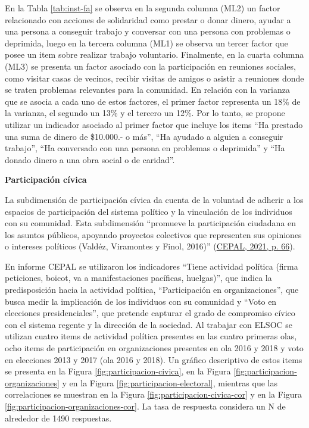 \documentclass[
  12pt,
]{book}
\begin{document}
En la Tabla \ref{tab:inst-fa} se observa en la segunda columna (ML2) un factor relacionado con acciones de solidaridad como prestar o donar dinero, ayudar a una persona a conseguir trabajo y conversar con una persona con problemas o deprimida, luego en la tercera columna (ML1) se observa un tercer factor que posee un item sobre realizar trabajo voluntario. Finalmente, en la cuarta columna (ML3) se presenta un factor asociado con la participación en reuniones sociales, como visitar casas de vecinos, recibir visitas de amigos o asistir a reuniones donde se traten problemas relevantes para la comunidad. En relación con la varianza que se asocia a cada uno de estos factores, el primer factor representa un 18\% de la varianza, el segundo un 13\% y el tercero un 12\%. Por lo tanto, se propone utilizar un indicador asociado al primer factor que incluye los items ``Ha prestado una suma de dinero de \$10.000.- o más'', ``Ha ayudado a alguien a conseguir trabajo'', ``Ha conversado con una persona en problemas o deprimida'' y ``Ha donado dinero a una obra social o de caridad''.

\textbf{Participación cívica}

La subdimensión de participación cívica da cuenta de la voluntad de adherir a los espacios de participación del sistema político y la vinculación de los individuos con su comunidad. Esta subdimensión ``promueve la participación ciudadana en los asuntos públicos, apoyando proyectos colectivos que representen sus opiniones o intereses políticos (Valdéz, Viramontes y Finol, 2016)'' (\protect\hyperlink{ref-cepal_cohesion_2021}{CEPAL, 2021, p. 66}).

En informe CEPAL se utilizaron los indicadores ``Tiene actividad política (firma peticiones, boicot, va a manifestaciones pacíficas, huelgas)'', que indica la predisposición hacia la actividad política, ``Participación en organizaciones'', que busca medir la implicación de los individuos con su comunidad y ``Voto en elecciones presidenciales'', que pretende capturar el grado de compromiso cívico con el sistema regente y la dirección de la sociedad. Al trabajar con ELSOC se utilizan cuatro items de actividad política presentes en las cuatro primeras olas, ocho items de participación en organizaciones presentes en ola 2016 y 2018 y voto en elecciones 2013 y 2017 (ola 2016 y 2018). Un gráfico descriptivo de estos items se presenta en la Figura \ref{fig:participacion-civica}, en la Figura \ref{fig:participacion-organizaciones} y en la Figura \ref{fig:participacion-electoral}, mientras que las correlaciones se muestran en la Figura \ref{fig:participacion-civica-cor} y en la Figura \ref{fig:participacion-organizaciones-cor}. La tasa de respuesta considera un N de alrededor de 1490 respuestas.
\end{document}

